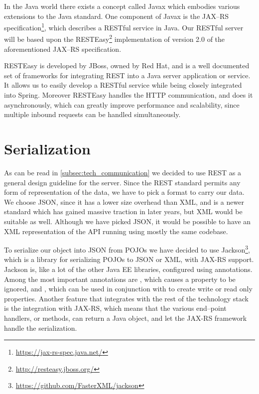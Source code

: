 \bigskip
In the Java world there exists a concept called Javax which embodies various extensions to the Java standard.
One component of Javax is the JAX--RS specification\footnote{\url{https://jax-rs-spec.java.net/}}, which describes a RESTful service in Java.
Our RESTful server will be based upon the RESTEasy\footnote{\url{http://resteasy.jboss.org/}} implementation of version 2.0 of the aforementioned JAX--RS specification.

RESTEasy is developed by JBoss, owned by Red Hat, and is a well documented set of frameworks for integrating REST into a Java server application or service.
It allows us to easily develop a RESTful service while being closely integrated into Spring.
Moreover RESTEasy handles the HTTP communication, and does it asynchronously, which can greatly improve performance and scalability,
since multiple inbound requests can be handled simultaneously.

\section{Serialization}\label{subsec:serialization_tech}
As can be read in \cref{subsec:tech_communication} we decided to use REST as a general design guideline for the server.
Since the REST standard permits any form of representation of the data, we have to pick a format to carry our data.
We choose JSON, since it has a lower size overhead than XML, and is a newer standard which has gained massive traction in later years, but XML would be suitable as well.
Although we have picked JSON, it would be possible to have an XML representation of the API running using mostly the same codebase.

To serialize our object into JSON from \acp{POJO} we have decided to use Jackson\footnote{\url{https://github.com/FasterXML/jackson}}, which is a library for serializing \acp{POJO} to JSON or XML, with JAX-RS support.
Jackson is, like a lot of the other \ac{Java EE} libraries, configured using annotations.
Among the most important annotations are , which causes a property to be ignored, and , which can be used in conjunction with  to create write or read only properties.
Another feature that integrates with the rest of the technology stack is the integration with JAX-RS, which means that the various end--point handlers, or methods, can return a Java object, and let the JAX-RS framework handle the serialization.

